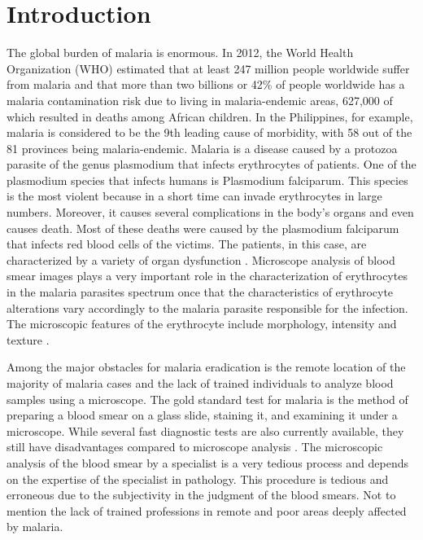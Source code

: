 \section{Introduction}
\label{intro}


The global burden of malaria is enormous. In 2012, the World Health Organization (WHO) estimated that at least 247 million people worldwide suffer from malaria and that more than two billions or 42\% of people worldwide has a malaria contamination risk due to living in malaria-endemic areas, 627,000 of which resulted in deaths among African children. In the Philippines, for example, malaria is considered to be the 9th leading cause of morbidity, with 58 out of the 81 provinces being malaria-endemic. Malaria is a disease caused by a protozoa parasite of the genus plasmodium that infects erythrocytes of patients. One of the plasmodium species that infects humans is Plasmodium falciparum. This species is the most violent because in a short time can invade erythrocytes in large numbers. Moreover, it causes several complications in the body's organs and even causes death. Most of these deaths were caused by the plasmodium falciparum that infects red blood cells of the victims. The patients, in this case, are characterized by a variety of organ dysfunction \cite{Dong2017}. Microscope analysis of blood smear images plays a very important role in the characterization of erythrocytes in the malaria parasites spectrum once that the characteristics of erythrocyte alterations vary accordingly to the malaria parasite responsible for the infection. The microscopic features of the erythrocyte include morphology, intensity and texture \cite{ShuleendaDevi2016}.

Among the major obstacles for malaria eradication is the remote location of the majority of malaria cases and the lack of trained individuals to analyze blood samples using a microscope. The gold standard test for malaria is the method of preparing a blood smear on a glass slide, staining it, and examining it under a microscope. While several fast diagnostic tests are also currently available, they still have disadvantages compared to microscope analysis \cite{Quinn2016DeepDiagnostics}\cite{Premaratne2006AFilms}\cite{Penas2017}. The microscopic analysis of the blood smear by a specialist is a very tedious process and depends on the expertise of the specialist in pathology. This procedure is tedious and erroneous due to the subjectivity in the judgment of the blood smears. Not to mention the lack of trained professions in remote and poor areas deeply affected by malaria. 

